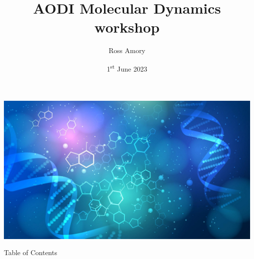 

\title{AODI Molecular Dynamics workshop}
\author{Ross Amory}
\date[1\textsuperscript{st} June 2023]{1\textsuperscript{st} June 2023}



{
{\includegraphics[width=\paperwidth,height=\paperheight]{figures/title_background.jpg}}
\frame{\titlepage}
}



\begin{frame}{Table of Contents}
	\begin{multicols}{2}
		\tableofcontents
	\end{multicols}
\end{frame}


%






